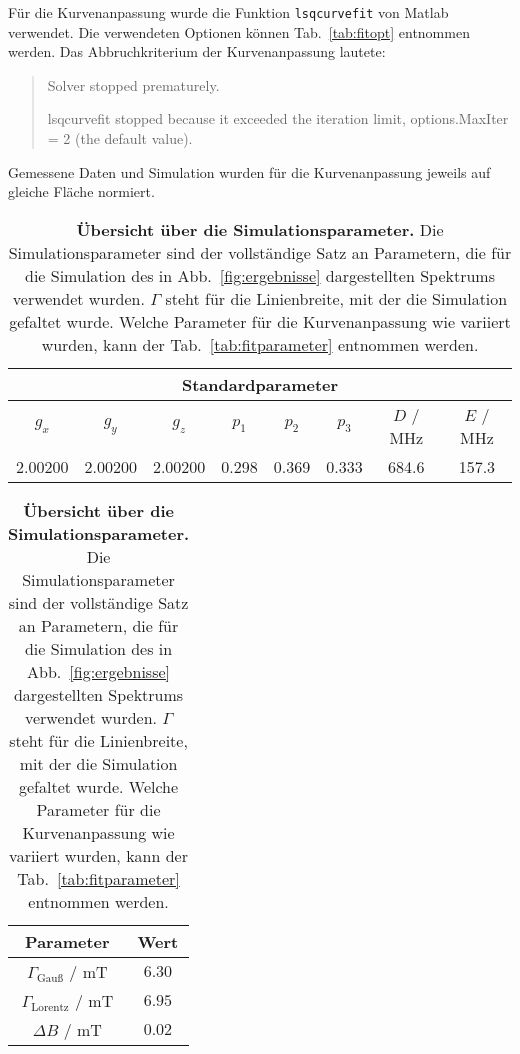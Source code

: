\documentclass{article}
\newcommand{\matlab}{\textsf{Matlab}}
\begin{document}
\clearpage


Für die Kurvenanpassung wurde die Funktion \texttt{lsqcurvefit} von \matlab{} verwendet. Die verwendeten Optionen können Tab.~\ref{tab:fitopt} entnommen werden. Das Abbruchkriterium der Kurvenanpassung lautete:

\begin{quote}\small
\ttfamily
Solver stopped prematurely.

lsqcurvefit stopped because it exceeded the iteration limit,
options.MaxIter = 2 (the default value).
\end{quote}

Gemessene Daten und Simulation wurden für die Kurvenanpassung jeweils auf gleiche Fläche normiert.

\begin{table}[h]
\caption{\textbf{Übersicht über die Simulationsparameter.} Die Simulationsparameter sind der vollständige Satz an Parametern, die für die Simulation des in Abb.~\ref{fig:ergebnisse} dargestellten Spektrums verwendet wurden. $\Gamma$ steht für die Linienbreite, mit der die Simulation gefaltet wurde. Welche Parameter für die Kurvenanpassung wie variiert wurden, kann der Tab.~\ref{tab:fitparameter} entnommen werden.}
\label{tab:simparameter}
\centering
\begin{tabular}{cccccccc} 
\toprule
\multicolumn{8}{c}{\textbf{Standardparameter} }
\\
\midrule 
$g_x$      & $g_y$      & $g_z$      & $p_1$   & $p_2$   & $p_3$   & $D$ / MHz & $E$ / MHz \\
2.00200 & 2.00200 & 2.00200 & 0.298 & 0.369 & 0.333 &   684.6  &   157.3     \\ 
\bottomrule
\end{tabular}

\begin{tabular}{cc}
\toprule
\textbf{Parameter} & \textbf{Wert}
\\
\midrule

$\Gamma_\text{Gauß}$ / mT & $6.30$
\\

$\Gamma_\text{Lorentz}$ / mT & $6.95$
\\

$\Delta B$ / mT & $0.02$
\\

\bottomrule
\end{tabular}
\end{table}
\end{document}
